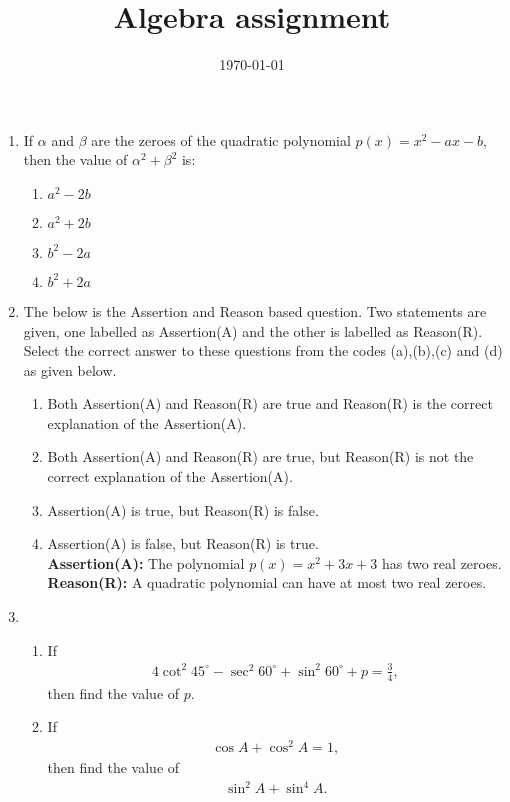 \documentclass[12pt,-letter paper]{article}
\title{Algebra assignment}
\date{\today}
\begin{document}

\begin{enumerate}

\item If $\alpha$ and $\beta$ are the zeroes of the quadratic polynomial $p(x)=x^2-ax-b$, then the value of $\alpha^2 + \beta^2$ is:


\begin{enumerate}
\item $a^2-2b$
\item $a^2+2b$
\item $b^2-2a$
\item $b^2+2a$
\end{enumerate}

\item The below is the Assertion and Reason based question. Two statements are given, one labelled as Assertion(A) and the other is labelled as Reason(R). Select the correct answer to these questions from the codes (a),(b),(c) and (d) as given below.
\begin{enumerate}
\item Both Assertion(A) and Reason(R) are true and Reason(R) is the correct explanation of the Assertion(A).
\item Both Assertion(A) and Reason(R) are true, but Reason(R) is not the correct explanation of the Assertion(A).
\item Assertion(A) is true, but Reason(R) is false.
\item Assertion(A) is false, but Reason(R) is true.\\ 
\textbf{Assertion(A):} The polynomial $p(x)=x^2+3x+3$ has two real zeroes.\\
\textbf{Reason(R):} A quadratic polynomial can have at most two real zeroes.

\end{enumerate}

\item
\begin{enumerate}
\item If 
\begin{align}
    4\cot^2 45^\circ - \sec^2 60^\circ + \sin^2 60^\circ + p = \frac{3}{4}, 
\end{align}
then find the value of $p$.
\item If 
\begin{align}
    \cos A+ \cos^2A=1,
\end{align}then find the value of 
\begin{align}
\sin^2A+\sin^4A.
\end{align}
\end{enumerate}



\end{enumerate}
\end{document}
